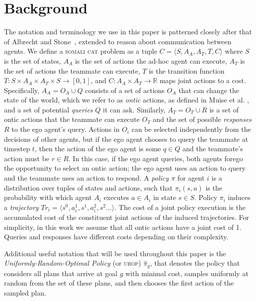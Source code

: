 \documentclass[letterpaper]{article}
\begin{document}
\section{Background}
The notation and terminology we use in this paper is patterned closely after that of Albrecht and Stone~, extended to reason about communication between agents. We define a \textsc{somali cat} problem as a tuple $C=\langle S, A_A, A_T, T, C \rangle$ where $S$ is the set of states, $A_A$ is the set of actions the ad-hoc agent can execute, $A_T$ is the set of actions the teammate can execute, $T$ is the transition function $T:S\times A_A \times A_T \times S \to [0,1]$, and $C: A_A \times A_T \rightarrow \mathbb{R}$ maps joint actions to a cost. Specifically, $A_A = O_A \cup Q$ consists of a set of actions $O_A$ that can change the state of the world, which we refer to as \emph{ontic} actions, as defined in Muise et al. , and a set of potential \emph{queries} $Q$ it can ask. Similarly, $A_T = O_T \cup R$ is a set of ontic actions that the teammate can execute $O_T$ and the set of possible \emph{responses} $R$ to the ego agent's query.
 Actions in $O_i$ can be selected independently from the decisions of other agents, but if the ego agent chooses to query the teammate at timestep $t$, then the action of the ego agent is some $q \in Q$ and the teammate's action must be $r \in R$. In this case, if the ego agent queries, both agents forego the opportunity to select an ontic action; the ego agent uses an action to query and the teammate uses an action to respond.
A \emph{policy $\pi$} for agent $i$ is a distribution over tuples of states and actions, such that $\pi_{i}(s,a)$ is the probability with which agent $A_i$ executes $a \in A_i$ in state $s \in S$.
Policy $\pi_i$ induces a \emph{trajectory} $Tr_i=\langle s^0, a_i^1, s^1, a_i^2, s^2... \rangle$.
The cost of a joint policy execution is the accumulated cost of the constituent joint actions of the induced trajectories.
For simplicity, in this work we assume that all ontic actions have a joint cost of 1. Queries and responses have different costs depending on their complexity.

Additional useful notation that will be used throughout this paper is the \emph{Uniformly-Random-Optimal Policy} (or \textsc{urop}) $\hat{\pi}_{g}$, that denotes the policy that considers all plans that arrive at goal $g$ with minimal cost, samples uniformly at random from the set of these plans, and then chooses the first action of the sampled plan.
\end{document}
